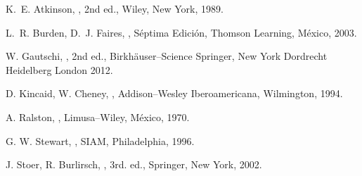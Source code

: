 \begin{thebibliography}{100}


K.~E. Atkinson,
, 2nd ed.,
\newblock Wiley, New York, 1989.

L.~R. Burden, D.~J. Faires,
, S\'eptima Edici\'on,
\newblock Thomson Learning, M\'exico, 2003.


W. Gautschi,
, 2nd ed.,
\newblock Birkh\"auser--Science Springer, New York Dordrecht Heidelberg London 2012.

D. Kincaid, W. Cheney,
,
\newblock Addison--Wesley Iberoamericana, Wilmington, 1994.

A. Ralston,
,
\newblock Limusa--Wiley, M\'exico, 1970.

G. W. Stewart,
,
\newblock SIAM, Philadelphia, 1996.

J. Stoer, R. Burlirsch,
, 3rd. ed.,
\newblock Springer, New York, 2002.

\end{thebibliography}
